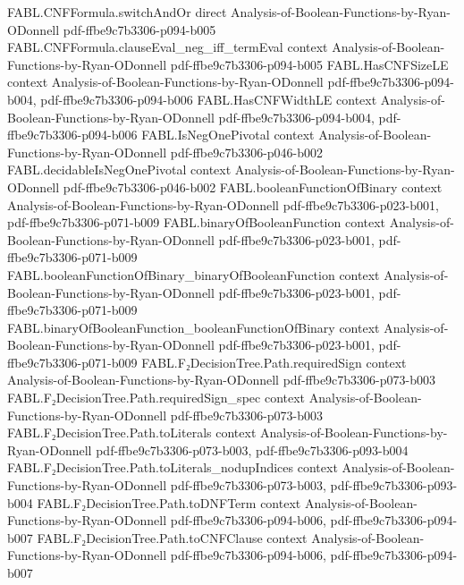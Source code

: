 \begin{theorem}
  {FABL.CNFFormula.switchAndOr}
  {direct}
  {Analysis-of-Boolean-Functions-by-Ryan-ODonnell}
  {pdf-ffbe9c7b3306-p094-b005}
\proofstep
  {FABL.CNFFormula.clauseEval_neg_iff_termEval}
  {context}
  {Analysis-of-Boolean-Functions-by-Ryan-ODonnell}
  {pdf-ffbe9c7b3306-p094-b005}
\proofstep
  {FABL.HasCNFSizeLE}
  {context}
  {Analysis-of-Boolean-Functions-by-Ryan-ODonnell}
  {pdf-ffbe9c7b3306-p094-b004,
    pdf-ffbe9c7b3306-p094-b006}
\proofstep
  {FABL.HasCNFWidthLE}
  {context}
  {Analysis-of-Boolean-Functions-by-Ryan-ODonnell}
  {pdf-ffbe9c7b3306-p094-b004,
    pdf-ffbe9c7b3306-p094-b006}
\proofstep
  {FABL.IsNegOnePivotal}
  {context}
  {Analysis-of-Boolean-Functions-by-Ryan-ODonnell}
  {pdf-ffbe9c7b3306-p046-b002}
\proofstep
  {FABL.decidableIsNegOnePivotal}
  {context}
  {Analysis-of-Boolean-Functions-by-Ryan-ODonnell}
  {pdf-ffbe9c7b3306-p046-b002}
\proofstep
  {FABL.booleanFunctionOfBinary}
  {context}
  {Analysis-of-Boolean-Functions-by-Ryan-ODonnell}
  {pdf-ffbe9c7b3306-p023-b001,
    pdf-ffbe9c7b3306-p071-b009}
\proofstep
  {FABL.binaryOfBooleanFunction}
  {context}
  {Analysis-of-Boolean-Functions-by-Ryan-ODonnell}
  {pdf-ffbe9c7b3306-p023-b001,
    pdf-ffbe9c7b3306-p071-b009}
\proofstep
  {FABL.booleanFunctionOfBinary_binaryOfBooleanFunction}
  {context}
  {Analysis-of-Boolean-Functions-by-Ryan-ODonnell}
  {pdf-ffbe9c7b3306-p023-b001,
    pdf-ffbe9c7b3306-p071-b009}
\proofstep
  {FABL.binaryOfBooleanFunction_booleanFunctionOfBinary}
  {context}
  {Analysis-of-Boolean-Functions-by-Ryan-ODonnell}
  {pdf-ffbe9c7b3306-p023-b001,
    pdf-ffbe9c7b3306-p071-b009}
\proofstep
  {FABL.F₂DecisionTree.Path.requiredSign}
  {context}
  {Analysis-of-Boolean-Functions-by-Ryan-ODonnell}
  {pdf-ffbe9c7b3306-p073-b003}
\proofstep
  {FABL.F₂DecisionTree.Path.requiredSign_spec}
  {context}
  {Analysis-of-Boolean-Functions-by-Ryan-ODonnell}
  {pdf-ffbe9c7b3306-p073-b003}
\proofstep
  {FABL.F₂DecisionTree.Path.toLiterals}
  {context}
  {Analysis-of-Boolean-Functions-by-Ryan-ODonnell}
  {pdf-ffbe9c7b3306-p073-b003,
    pdf-ffbe9c7b3306-p093-b004}
\proofstep
  {FABL.F₂DecisionTree.Path.toLiterals_nodupIndices}
  {context}
  {Analysis-of-Boolean-Functions-by-Ryan-ODonnell}
  {pdf-ffbe9c7b3306-p073-b003,
    pdf-ffbe9c7b3306-p093-b004}
\proofstep
  {FABL.F₂DecisionTree.Path.toDNFTerm}
  {context}
  {Analysis-of-Boolean-Functions-by-Ryan-ODonnell}
  {pdf-ffbe9c7b3306-p094-b006,
    pdf-ffbe9c7b3306-p094-b007}
\proofstep
  {FABL.F₂DecisionTree.Path.toCNFClause}
  {context}
  {Analysis-of-Boolean-Functions-by-Ryan-ODonnell}
  {pdf-ffbe9c7b3306-p094-b006,
    pdf-ffbe9c7b3306-p094-b007}

\end{theorem}
